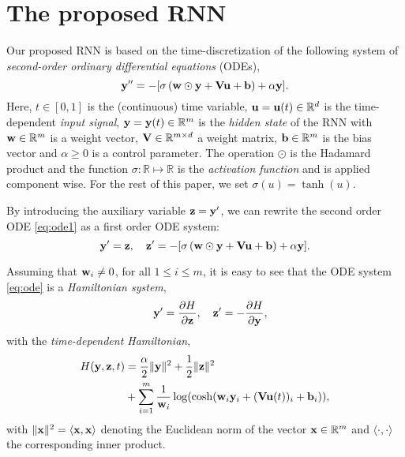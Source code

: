 \documentclass{article}
\newcommand{\by}{{\bf y}}
\newcommand{\bz}{{\bf z}}
\newcommand{\bw}{{\bf w}}
\newcommand{\bu}{{\bf u}}
\newcommand{\bb}{{\bf b}}
\newcommand{\bV}{{\bf V}}
\newcommand{\R}{{\mathbb R}}
\begin{document}
\section{The proposed RNN}
Our proposed RNN is based on the time-discretization of the following system of \emph{second-order ordinary differential equations} (ODEs),
\begin{equation}
\label{eq:ode1}
\by^{\prime \prime} = -[\sigma\left(\bw \odot \by + \bV \bu + \bb \right) + \alpha \by].
\end{equation}
Here, $t \in [0,1]$ is the (continuous) time variable, $\bu = \bu(t) \in  \R^d$ is the time-dependent \emph{input signal}, $\by = \by (t) \in \R^m$ is the \emph{hidden state} of the RNN with $\bw \in \R^{m}$ is a weight vector, $\bV \in \R^{m \times d}$ a weight matrix,
$\bb \in \R^m$ is the bias vector and $\alpha \geq 0$ is a control parameter. The operation $\odot$ is the Hadamard product and the function $\sigma: \R \mapsto \R$ is the \emph{activation function} and is applied component wise. For the rest of this paper, we set $\sigma (u) = \tanh(u)$.

By introducing the auxiliary variable $\bz=\by^\prime$, we can rewrite the second order ODE \eqref{eq:ode1} as a first order ODE system:
\begin{equation}
\label{eq:ode}
\by^{\prime} = \bz, \quad \bz^{\prime}= -[\sigma\left(\bw \odot \by + \bV \bu + \bb \right)+\alpha \by].
\end{equation}

Assuming that $\bw_i \neq 0$, for all $1 \leq i \leq m$, it is easy to see that the ODE system \eqref{eq:ode} is a \emph{Hamiltonian system},
\begin{align}
\label{eq:ham1}
 \quad \by^{\prime} = \frac{\partial H}{\partial \bz},\quad   \bz^{\prime}= -\frac{\partial H}{\partial \by}, 
\end{align}
with the \emph{time-dependent Hamiltonian},
\begin{equation}
\label{eq:hamil}
\begin{aligned}
    H(\by,\bz,t) &= \frac{\alpha}{2}\|\by\|^2 + \frac{1}{2}\|\bz\|^2 \\
    & + \sum_{i=1}^m \frac{1}{\bw_i}\log(\cosh( \bw_i\by_i + (\bV \bu(t))_i 
    + \bb_i)),
\end{aligned}
\end{equation}
with $\|{\bf x}\|^2 = \langle {\bf x}, {\bf x} \rangle$ denoting the Euclidean norm of the vector ${\bf x} \in \R^m$ and $\langle \cdot,\cdot \rangle$ the corresponding inner product.
\end{document}
